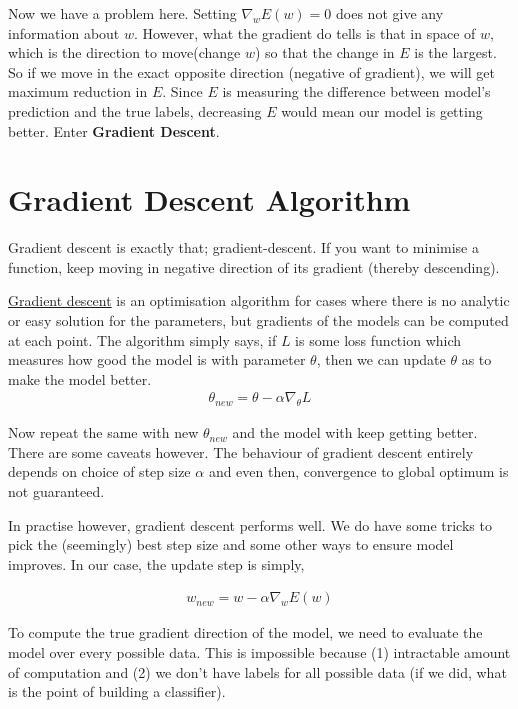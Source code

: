 \documentclass[10pt]{article}
\begin{document}
Now we have a problem here. Setting $\nabla_w E(w)=0$ does not give any information about $w$. 
However, what the gradient do tells is that in space of $w$, which is the direction to move(change $w$) so that the change in $E$ is the largest. So if we move in the exact opposite direction (negative of gradient), we will get maximum reduction in $E$. Since $E$ is measuring the difference between model's prediction and the true labels, decreasing $E$ would mean our model is getting better. Enter \textbf{Gradient Descent}.

\section{Gradient Descent Algorithm}
Gradient descent is exactly that; gradient-descent. If you want to minimise a function, keep moving in  negative direction of its gradient (thereby descending).

\href{https://en.wikipedia.org/wiki/Gradient_descent}{Gradient descent} is an optimisation algorithm for cases where there is no analytic or easy solution for the parameters, but gradients of the models can be computed at each point. The algorithm simply says, if $L$ is some loss function which measures how good the model is with parameter $\theta$, then we can update $\theta$ as to make the model better.
$$ \begin{aligned}
\theta_{new} = \theta - \alpha \nabla_\theta L
\end{aligned} $$

Now repeat the same with new $\theta_{new}$ and the model with keep getting better. There are some caveats however. The behaviour of gradient descent entirely depends on choice of step size $\alpha$ and even then, convergence to global optimum is not guaranteed. 

In practise however, gradient descent performs well. We do have some tricks to pick the (seemingly) best step size and some other ways to ensure model improves. In our case, the update step is simply, 

$$ \begin{aligned}
w_{new} = w - \alpha \nabla_{w}E(w)
\end{aligned} $$


To compute the true gradient direction of the model, we need to evaluate the model over every possible data. This is impossible because (1) intractable amount of computation and (2) we don't have labels for all possible data (if we did, what is the point of building a classifier). 
\end{document}
